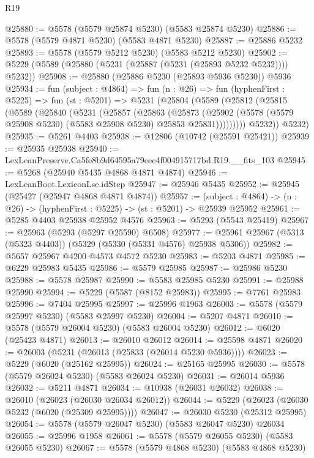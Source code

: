 \begin{lexlean}{R19}
\begin{coremodule}
@25880 := @5578 (@5579 @25874 @5230) (@5583 @25874 @5230)
@25886 := @5578 (@5579 @4871 @5230) (@5583 @4871 @5230)
@25887 := @25886 @5232
@25893 := @5578 (@5579 @5212 @5230) (@5583 @5212 @5230)
@25902 := @5229 (@5589 (@25880 (@5231 (@25887 (@5231 (@25893 @5232 @5232)))) @5232))
@25908 := @25880 (@25886 @5230 (@25893 @5936 @5230)) @5936
@25934 := fun (subject : @4864) =>
  fun (n : @26) =>
  fun (hyphenFirst : @5225) =>
  fun (st : @5201) =>
  @5231
    (@25804
      (@5589
        (@25812
          (@25815
            (@5589
              (@25840
                (@5231
                  (@25857
                    (@25863
                      (@25873
                        (@25902
                          (@5578 (@5579 @25908 @5230) (@5583 @25908 @5230) @25853 @25831)))))))))
          @5232))
      @5232)
@25935 := @5261 @4403
@25938 := @12806 (@10742 (@25591 @25421))
@25939 := @25935 @25938
@25940 := LexLeanPreserve.Ca5fe8b9d64595a79eee4f004915717bd.R19.__fits_103
@25945 := @5268 (@25940 @5435 @4868 @4871 @4874)
@25946 := LexLeanBoot.LexiconLse.idStep
@25947 := @25946 @5435
@25952 := @25945 (@25427 (@25947 @4868 @4871 @4874))
@25957 := (subject : @4864) -> (n : @26) -> (hyphenFirst : @5225) -> (st : @5201) -> @25939 @25952
@25961 := @5285 @4403 @25938 @25952 @4576
@25963 := @5293 (@5543 @25419)
@25967 := @25963 (@5293 (@5297 @25590) @6508)
@25977 := @25961 @25967 (@5313 (@5323 @4403)) (@5329 (@5330 (@5331 @4576) @25938 @5306))
@25982 := @5657 @25967 @4200 @4573 @4572 @5230
@25983 := @5203 @4871
@25985 := @6229 @25983 @5435
@25986 := @5579 @25985
@25987 := @25986 @5230
@25988 := @5578 @25987
@25990 := @5583 @25985 @5230
@25991 := @25988 @25990
@25994 := @5229 (@5587 (@8152 @25983))
@25995 := @7761 @25983
@25996 := @7404 @25995
@25997 := @25996 @1963
@26003 := @5578 (@5579 @25997 @5230) (@5583 @25997 @5230)
@26004 := @5207 @4871
@26010 := @5578 (@5579 @26004 @5230) (@5583 @26004 @5230)
@26012 := @6020 (@25423 @4871)
@26013 := @26010 @26012
@26014 := @25598 @4871
@26020 := @26003 (@5231 (@26013 (@25833 (@26014 @5230 @5936))))
@26023 := @5229 (@6020 (@25162 @25995))
@26024 := @25165 @25995
@26030 := @5578 (@5579 @26024 @5230) (@5583 @26024 @5230)
@26031 := @26014 @5936
@26032 := @5211 @4871
@26034 := @10938 (@26031 @26032)
@26038 := @26010 (@26023 (@26030 @26034 @26012))
@26044 := @5229 (@26023 (@26030 @5232 (@6020 (@25309 @25995))))
@26047 := @26030 @5230 (@25312 @25995)
@26054 := @5578 (@5579 @26047 @5230) (@5583 @26047 @5230) @26034
@26055 := @25996 @1958
@26061 := @5578 (@5579 @26055 @5230) (@5583 @26055 @5230)
@26067 := @5578 (@5579 @4868 @5230) (@5583 @4868 @5230)

\end{coremodule}
\end{lexlean}
